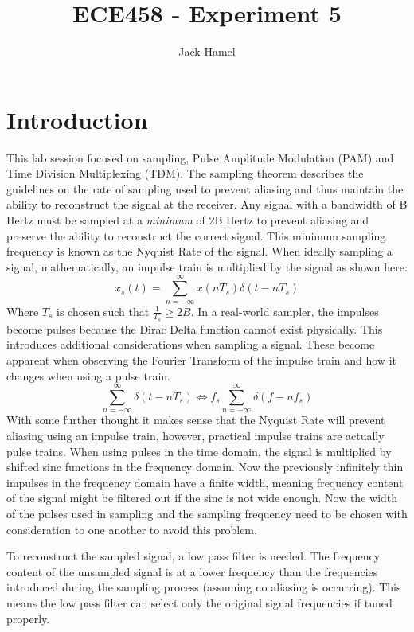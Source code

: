 \documentclass[letterpaper,11pt]{article}
\title{ECE458 - Experiment 5}
\author{Jack Hamel}
\begin{document}
\maketitle

\section{Introduction}

This lab session focused on sampling, Pulse Amplitude Modulation (PAM) and Time Division Multiplexing (TDM).  The sampling theorem describes the guidelines on the rate of sampling used to prevent aliasing and thus maintain the ability to reconstruct the signal at the receiver.  Any signal with a bandwidth of B Hertz must be sampled at a \textit{minimum} of 2B Hertz to prevent aliasing and preserve the ability to reconstruct the correct signal.  This minimum sampling frequency is known as the Nyquist Rate of the signal.  When ideally sampling a signal, mathematically, an impulse train is multiplied by the signal as shown here:
\begin{equation}
  x_s(t) = \sum_{n=-\infty}^\infty x(nT_s)\delta(t-nT_s)
\end{equation}
Where $T_s$ is chosen such that $\frac{1}{T_s}\geq 2B$.  In a real-world sampler, the impulses become pulses because the Dirac Delta function cannot exist physically.  This introduces additional considerations when sampling a signal.  These become apparent when observing the Fourier Transform of the impulse train and how it changes when using a pulse train.
\begin{equation}
  \sum_{n=-\infty}^\infty \delta(t-nT_s) \Longleftrightarrow f_s\sum_{n=-\infty}^\infty \delta(f-nf_s)
\end{equation}
With some further thought it makes sense that the Nyquist Rate will prevent aliasing using an impulse train, however, practical impulse trains are actually pulse trains.  When using pulses in the time domain, the signal is multiplied by shifted sinc functions in the frequency domain.  Now the previously infinitely thin impulses in the frequency domain have a finite width, meaning frequency content of the signal might be filtered out if the sinc is not wide enough.  Now the width of the pulses used in sampling and the sampling frequency need to be chosen with consideration to one another to avoid this problem.

To reconstruct the sampled signal, a low pass filter is needed.  The frequency content of the unsampled signal is at a lower frequency than the frequencies introduced during the sampling process (assuming no aliasing is occurring).  This means the low pass filter can select only the original signal frequencies if tuned properly.
\end{document}

